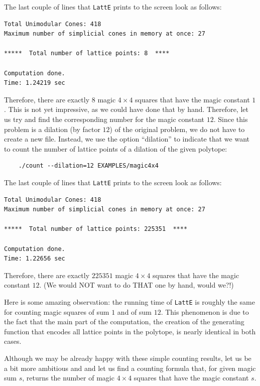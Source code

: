 \documentclass{article}
\begin{document}
The last couple of lines that {\tt LattE} prints to the screen
look as follows:
\begin{verbatim}
Total Unimodular Cones: 418
Maximum number of simplicial cones in memory at once: 27

*****  Total number of lattice points: 8  ****

Computation done.
Time: 1.24219 sec
\end{verbatim}
Therefore, there are exactly $8$ magic $4\times 4$ squares that
have the magic constant $1$. This is not yet impressive, as we could
have done that by hand. Therefore, let us try and find the
corresponding number for the magic constant $12$. Since this problem
is a dilation (by factor $12$) of the original problem, we do not have
to create a new file. Instead, we use the option ``dilation'' to indicate
that we want to count the number of lattice points of a dilation of
the given polytope:
\begin{verbatim}
    ./count --dilation=12 EXAMPLES/magic4x4
\end{verbatim}
The last couple of lines that {\tt LattE} prints to the screen
look as follows:
\begin{verbatim}
Total Unimodular Cones: 418
Maximum number of simplicial cones in memory at once: 27

*****  Total number of lattice points: 225351  ****

Computation done.
Time: 1.22656 sec
\end{verbatim}
Therefore, there are exactly $225351$ magic $4\times 4$ squares that
have the magic constant $12$. (We would NOT want to do THAT one by
hand, would we?!) 

Here is some amazing observation: the running time of {\tt LattE}
is roughly the same for counting magic squares of sum $1$ and of sum
$12$. This phenomenon is due to the fact that the main part of the
computation, the creation of the generating function that encodes all
lattice points in the polytope, is nearly identical in both cases.

Although we may be already happy with these simple counting results,
let us be a bit more ambitious and and let us find a counting formula
that, for given magic sum $s$, returns the number of magic 
$4\times 4$ squares that have the magic constant $s$.
\end{document}
